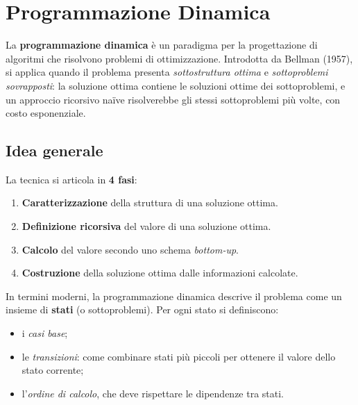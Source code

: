 \section{Programmazione Dinamica}

\begin{softnote}
La \textbf{programmazione dinamica} è un paradigma per la progettazione di algoritmi
che risolvono problemi di ottimizzazione. Introdotta da Bellman (1957), si applica
quando il problema presenta \emph{sottostruttura ottima} e \emph{sottoproblemi
	sovrapposti}: la soluzione ottima contiene le soluzioni ottime dei sottoproblemi, e
un approccio ricorsivo naïve risolverebbe gli stessi sottoproblemi più volte,
con costo esponenziale.
\end{softnote}

\subsection{Idea generale}

La tecnica si articola in \textbf{4 fasi}:

\begin{enumerate}
\item \textbf{Caratterizzazione} della struttura di una soluzione ottima.
\item \textbf{Definizione ricorsiva} del valore di una soluzione ottima.
\item \textbf{Calcolo} del valore secondo uno schema \emph{bottom-up}.
\item \textbf{Costruzione} della soluzione ottima dalle informazioni calcolate.
\end{enumerate}

In termini moderni, la programmazione dinamica descrive il problema come un insieme
di \textbf{stati} (o sottoproblemi). Per ogni stato si definiscono:
\begin{itemize}
\item i \emph{casi base};
\item le \emph{transizioni}: come combinare stati più piccoli per ottenere il
valore dello stato corrente;
\item l'\emph{ordine di calcolo}, che deve rispettare le dipendenze tra stati.
\end{itemize}

